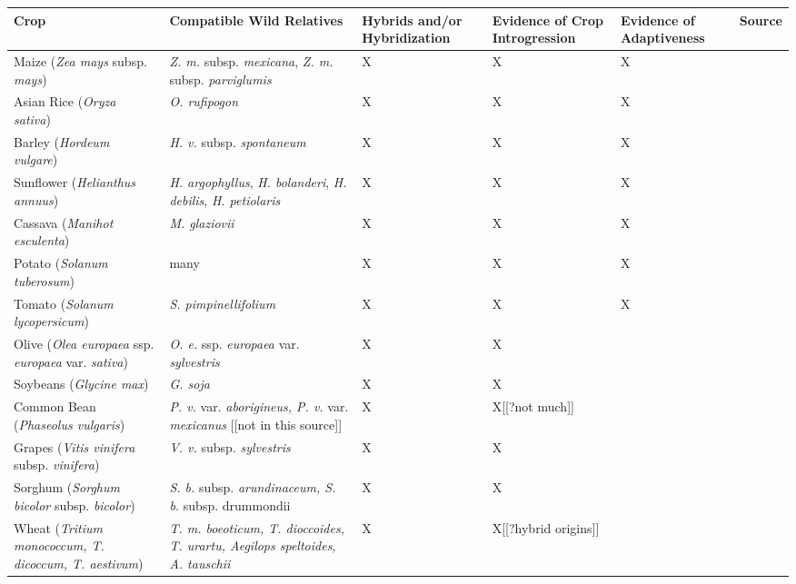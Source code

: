\documentclass[11pt]{article}
\begin{document}
	
	

	
	
	
	
	
	
	
	





\begin{table}
\centering
\begin{adjustbox}{width=1\textwidth}
\small
\label{my-label}
\begin{tabular}{|p{5cm}|p{5cm}|p{2.6cm}|p{2.6cm}|p{2.6cm}|l|}
\hline
Crop & Compatible Wild Relatives & Hybrids and/or Hybridization & Evidence of Crop Introgression & Evidence of Adaptiveness & Source \\ \hline \hline
Maize (\emph{Zea mays} subsp. \emph{mays}) & \emph{Z. m.} subsp. \emph{mexicana}, \emph{Z. m. } subsp. \emph{parviglumis} & X & X & X & \cite{hufford2013genomic} \\ 
\hline 
Asian Rice (\emph{Oryza sativa}) & \emph{O. rufipogon} & X & X & X & \cite{Huang2012} \\ 
\hline
Barley (\emph{Hordeum vulgare}) & \emph{H. v.} subsp. \emph{spontaneum} & X & X & X & \cite{Poets2015} \\ \hline
Sunflower (\emph{Helianthus annuus}) & \emph{H. argophyllus}, \emph{H. bolanderi}, \emph{H. debilis}, \emph{H. petiolaris} & X & X & X & \cite{rieseberg2007hybridization}\\ 
\hline
Cassava (\emph{Manihot esculenta}) & \emph{M. glaziovii} & X & X & X & \cite{bredeson2016sequencing} \\ 
\hline
Potato (\emph{Solanum tuberosum}) & many & X & X & X & \cite{johns1986ongoing} \\
\hline
Tomato (\emph{Solanum lycopersicum}) & \emph{S. pimpinellifolium} & X & X & X & \cite{rick1958role} \\
\hline
Olive (\emph{Olea europaea} ssp. \emph{europaea} var. \emph{sativa}) & \emph{O. e.} ssp. \emph{europaea} var. \emph{sylvestris} & X & X & & \cite{diez2015olive} \\ 
\hline
Soybeans (\emph{Glycine max}) & \emph{G. soja} & X & X &  & \cite{lam2010resequencing} \\ 
\hline
Common Bean (\emph{Phaseolus vulgaris}) & \emph{P. v.} var. \emph{aborigineus, P. v.} var. \emph{mexicanus} [[not in this source]]& X & X[[?not much]] &  & \cite{papa2003asymmetry} \\
\hline
Grapes (\emph{Vitis vinifera} subsp. \emph{vinifera}) & \emph{V. v.} subsp. \emph{sylvestris} & X & X &  &  \cite{myles2011genetic} \\
\hline
Sorghum (\emph{Sorghum bicolor} subsp. \emph{bicolor}) & \emph{S. b.} subsp. \emph{arundinaceum, S. b.} subsp. {drummondii} & X & X &  & \cite{aldrich1992patterns} \\
\hline
Wheat (\emph{Tritium monococcum, T. dicoccum, T. aestivum}) & \emph{T. m. boeoticum, T. dioccoides, T. urartu, Aegilops speltoides, A. tauschii} & X & X[[?hybrid origins]] &  & \cite{zohary1969wild} \\
\hline
\end{tabular}
\end{adjustbox}
\end{table}
\end{document}
